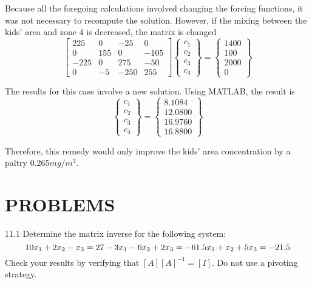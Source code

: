 \documentclass[../main.tex]{subfiles}
\begin{document}
Because all the foregoing calculations involved changing the forcing functions, it was
not necessary to recompute the solution. However, if the mixing between the kids' area and
zone 4 is decreased, the matrix is changed
\begin{equation}
\begin{bmatrix}
225& 0& -25& 0\\
0& 155& 0& -105\\
-225& 0& 275& -50\\
0& -5& -250& 255
\end{bmatrix}
\begin{Bmatrix}
c_{1}\\ 
c_{2}\\ 
c_{3}\\ 
c_{4}
\end{Bmatrix}
=
\begin{Bmatrix}
1400\\
100\\
2000\\
0
\end{Bmatrix}
\end{equation}

The results for this case involve a new solution. Using MATLAB, the result is
\begin{equation}
\begin{Bmatrix}
c_{1}\\ 
c_{2}\\ 
c_{3}\\ 
c_{4}
\end{Bmatrix}
=
\begin{Bmatrix}
8.1084\\
12.0800\\
16.9760\\
16.8800
\end{Bmatrix}
\end{equation}

Therefore, this remedy would only improve the kids' area concentration by a paltry $0.265 mg/m^{3}$. 


\section*{PROBLEMS}


11.1 Determine the matrix inverse for the following system:
\begin{equation}
10x_{1} + 2x_{2} - x_{3} = 27\\
-3x_{1} - 6x_{2} + 2x_{3} = -61.5\\
x_{1} + x_{2} + 5x_{3} = -21.5
\end{equation}
Check your results by verifying that $[A][A]^{-1} = [I]$. Do not use a pivoting strategy.
\end{document}
